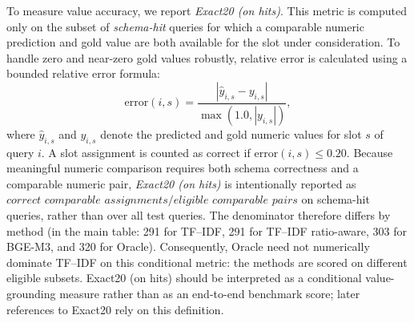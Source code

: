 \documentclass[pdflatex,sn-basic,Numbered]{sn-jnl}
\begin{document}
To measure value accuracy, we report \textit{Exact20 (on hits)}. This metric is computed only on the subset of \emph{schema-hit} queries for which a comparable numeric prediction and gold value are both available for the slot under consideration. To handle zero and near-zero gold values robustly, relative error is calculated using a bounded relative error formula:
\begin{equation}
\mathrm{error}(i,s) = \frac{|\hat{y}_{i,s} - y_{i,s}|}{\max(1.0, |y_{i,s}|)},
\label{eq:bounded_error}
\end{equation}
where $\hat{y}_{i,s}$ and $y_{i,s}$ denote the predicted and gold numeric values for slot $s$ of query $i$. A slot assignment is counted as correct if $\mathrm{error}(i,s) \leq 0.20$. Because meaningful numeric comparison requires both schema correctness and a comparable numeric pair, \textit{Exact20 (on hits)} is intentionally reported as $\textit{correct comparable assignments} / \textit{eligible comparable pairs}$ on schema-hit queries, rather than over all test queries. The denominator therefore differs by method (in the main table: 291 for TF--IDF, 291 for TF--IDF ratio-aware, 303 for BGE-M3, and 320 for Oracle). Consequently, Oracle need not numerically dominate TF--IDF on this conditional metric: the methods are scored on different eligible subsets. Exact20 (on hits) should be interpreted as a conditional value-grounding measure rather than as an end-to-end benchmark score; later references to Exact20 rely on this definition.
\end{document}
